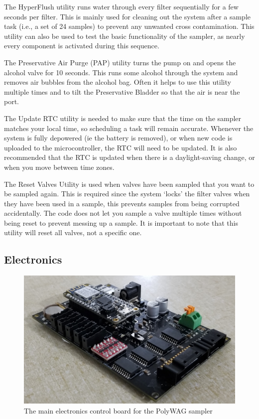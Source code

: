 \documentclass[11pt, letterpaper]{article}
\begin{document}
The HyperFlush utility runs water through every filter sequentially for a few seconds per filter. This is mainly used for cleaning out the system after a sample task (i.e., a set of 24 samples) to prevent any unwanted cross contamination. This utility can also be used to test the basic functionality of the sampler, as nearly every component is activated during this sequence. 
\newline\par\noindent
The Preservative Air Purge (PAP) utility turns the pump on and opens the alcohol valve for 10 seconds. This runs some alcohol through the system and removes air bubbles from the alcohol bag. Often it helps to use this utility multiple times and to tilt the Preservative Bladder so that the air is near the port.
\newline\par\noindent
The Update RTC utility is needed to make sure that the time on the sampler matches your local time, so scheduling a task will remain accurate. Whenever the system is fully depowered (ie the battery is removed), or when new code is uploaded to the microcontroller, the RTC will need to be updated. It is also recommended that the RTC is updated when there is a daylight-saving change, or when you move between time zones.
\newline\par\noindent
The Reset Valves Utility is used when valves have been sampled that you want to be sampled again. This is required since the system ‘locks’ the filter valves when they have been used in a sample, this prevents samples from being corrupted accidentally. The code does not let you sample a valve multiple times without being reset to prevent messing up a sample. It is important to note that this utility will reset all valves, not a specific one.

\subsection{Electronics}
\begin{figure}[H]
	\centering
	\includegraphics[scale=0.15]{./Assets/eDNABoard.jpg}
	\caption{The main electronics control board for the PolyWAG sampler}
\end{figure}
\end{document}
